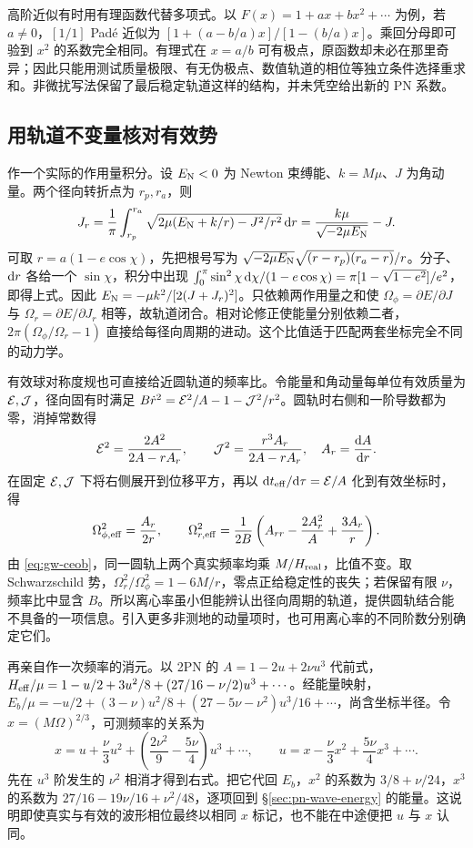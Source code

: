 高阶近似有时用有理函数代替多项式。以 $F(x)=1+a x+b x^2+\cdots$ 为例，若 $a\ne0$，$[1/1]$ Padé 近似为 $[1+(a-b/a)x]/[1-(b/a)x]$。乘回分母即可验到 $x^2$ 的系数完全相同。有理式在 $x=a/b$ 可有极点，原函数却未必在那里奇异；因此只能用测试质量极限、有无伪极点、数值轨道的相位等独立条件选择重求和。非微扰写法保留了最后稳定轨道这样的结构，并未凭空给出新的 PN 系数。

\subsection{用轨道不变量核对有效势}

作一个实际的作用量积分。设 $E_{\rm N}<0$ 为 Newton 束缚能、$k=M\mu$、$J$ 为角动量。两个径向转折点为 $r_p,r_a$，则
\[
 J_r=\frac{1}{\pi}\int_{r_p}^{r_a}
    \sqrt{2\mu(E_{\rm N}+k/r)-J^2/r^2}\,\dd r
    =\frac{k\mu}{\sqrt{-2\mu E_{\rm N}}}-J .
\]
可取 $r=a(1-e\cos\chi)$，先把根号写为 $\sqrt{-2\mu E_{\rm N}}\sqrt{(r-r_p)(r_a-r)}/r$。分子、$\dd r$ 各给一个 $\sin\chi$，积分中出现 $\int_0^\pi\sin^2\chi\,\dd\chi/(1-e\cos\chi)=\pi[1-\sqrt{1-e^2}]/e^2$，即得上式。因此 $E_{\rm N}=-\mu k^2/[2(J+J_r)^2]$。只依赖两作用量之和使 $\Omega_\phi=\partial E/\partial J$ 与 $\Omega_r=\partial E/\partial J_r$ 相等，故轨道闭合。相对论修正使能量分别依赖二者，$2\pi(\Omega_\phi/\Omega_r-1)$ 直接给每径向周期的进动。这个比值适于匹配两套坐标完全不同的动力学。

有效球对称度规也可直接给近圆轨道的频率比。令能量和角动量每单位有效质量为 ${\cal E},{\cal J}$，径向固有时满足 $B\dot r^2={\cal E}^2/A-1-{\cal J}^2/r^2$。圆轨时右侧和一阶导数都为零，消掉常数得
\[
 {\cal E}^2=\frac{2A^2}{2A-r A_r},\qquad
 {\cal J}^2=\frac{r^3 A_r}{2A-r A_r},
 \quad A_r=\frac{\dd A}{\dd r}.
\]
在固定 ${\cal E},{\cal J}$ 下将右侧展开到位移平方，再以 $\dd t_{\rm eff}/\dd\tau={\cal E}/A$ 化到有效坐标时，得
\[
 \Omega_{\phi,\rm eff}^2=\frac{A_r}{2r},\qquad
 \Omega_{r,\rm eff}^2=\frac{1}{2B}\left(A_{rr}
              -\frac{2A_r^2}{A}+\frac{3A_r}{r}\right).
\]
由 \eqref{eq:gw-ceob}，同一圆轨上两个真实频率均乘 $M/H_{\rm real}$，比值不变。取 Schwarzschild 势，$\Omega_r^2/\Omega_\phi^2=1-6M/r$，零点正给稳定性的丧失；若保留有限 $\nu$，频率比中显含 $B$。所以离心率虽小但能辨认出径向周期的轨道，提供圆轨结合能不具备的一项信息。引入更多非测地的动量项时，也可用离心率的不同阶数分别确定它们。

再亲自作一次频率的消元。以 2PN 的 $A=1-2u+2\nu u^3$ 代前式，$H_{\rm eff}/\mu=1-u/2+3u^2/8+(27/16-\nu/2)u^3+\cdots$。经能量映射，$E_b/\mu=-u/2+(3-\nu)u^2/8+(27-5\nu-\nu^2)u^3/16+\cdots$，尚含坐标半径。令 $x=(M\Omega)^{2/3}$，可测频率的关系为
\[
 x=u+\frac{\nu}{3}u^2+
       \left(\frac{2\nu^2}{9}-\frac{5\nu}{4}\right)u^3+\cdots,\qquad
 u=x-\frac{\nu}{3}x^2+\frac{5\nu}{4}x^3+\cdots .
\]
先在 $u^3$ 阶发生的 $\nu^2$ 相消才得到右式。把它代回 $E_b$，$x^2$ 的系数为 $3/8+\nu/24$，$x^3$ 的系数为 $27/16-19\nu/16+\nu^2/48$，逐项回到 \S\ref{sec:pn-wave-energy} 的能量。这说明即使真实与有效的波形相位最终以相同 $x$ 标记，也不能在中途便把 $u$ 与 $x$ 认同。

